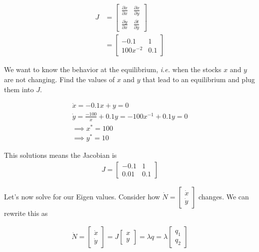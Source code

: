 \documentclass{article}
\begin{document}
\begin{align}
    J &= \begin{bmatrix}
            \frac{\partial \dot x}{\partial x} & \frac{\partial \dot x}{\partial y}\\
            \frac{\partial \dot y}{\partial x} & \frac{\partial \dot t}{\partial y}
    \end{bmatrix}\\
        & = \begin{bmatrix}
            -0.1& 1\\
            100 x ^{-2} & 0.1
    \end{bmatrix}
\end{align}

We want to know the behavior at the equilibrium, \textit{i.e.} when the stocks $x$ and $y$ are not changing. Find the values of $x$ and $y$ that lead to an equilibrium and plug them into $J$. 

\begin{align}
    \dot x = -0.1x + y = 0 \\
    \dot y = \frac{-100}{x} + 0.1 y = -100 x^{-1} + 0.1 y = 0\\
    \implies x^* = 100 \\
    \implies y^* = 10
\end{align}

This solutions means the Jacobian is 
\begin{align}
    J = \begin{bmatrix}
            -0.1& 1\\
            0.01 & 0.1
    \end{bmatrix} \label{jacobian}
\end{align}

Let's now solve for our Eigen values. Consider how $\dot N = \begin{bmatrix}
    \dot x\\
    \dot y
\end{bmatrix}$ changes. We can rewrite this as 

\begin{align}
    \dot N = \begin{bmatrix}
        \dot x\\
        \dot y
\end{bmatrix}  = J \begin{bmatrix}
        x\\
        y
\end{bmatrix} = \lambda q  = \lambda \begin{bmatrix}
        q_1\\
        q_2
\end{bmatrix} \label{setup}
\end{align}
\end{document}
